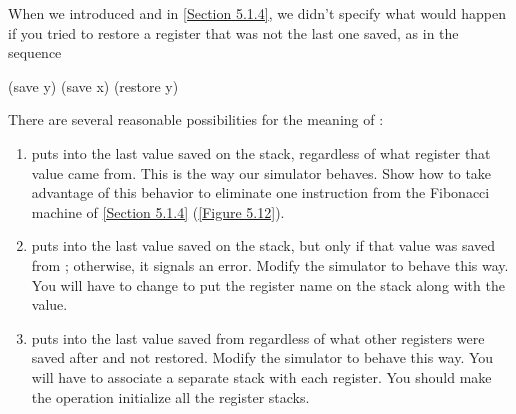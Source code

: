 \begin{exercise}
	\label{Exercise 5.11}
	When we introduced  and  in \cref{Section 5.1.4}, we didn’t specify what would happen if you tried to restore a register that was not the last one saved, as in the sequence
	\begin{scheme}
	  (save y)  (save x)  (restore y)
	\end{scheme}
	There are several reasonable possibilities for the meaning of :
	\begin{enumerate}[label = \alph*., leftmargin = *]

		\item
			 puts into  the last value saved on the stack, regardless of what register that value came from.
			This is the way our simulator behaves.
			Show how to take advantage of this behavior to eliminate one instruction from the Fibonacci machine of \cref{Section 5.1.4} (\cref{Figure 5.12}).

		\item
			 puts into  the last value saved on the stack, but only if that value was saved from ;
			otherwise, it signals an error.
			Modify the simulator to behave this way.
			You will have to change  to put the register name on the stack along with the value.

		\item
			 puts into  the last value saved from  regardless of what other registers were saved after  and not restored.
			Modify the simulator to behave this way.
			You will have to associate a separate stack with each register.
			You should make the  operation initialize all the register stacks.

	\end{enumerate}
\end{exercise}



